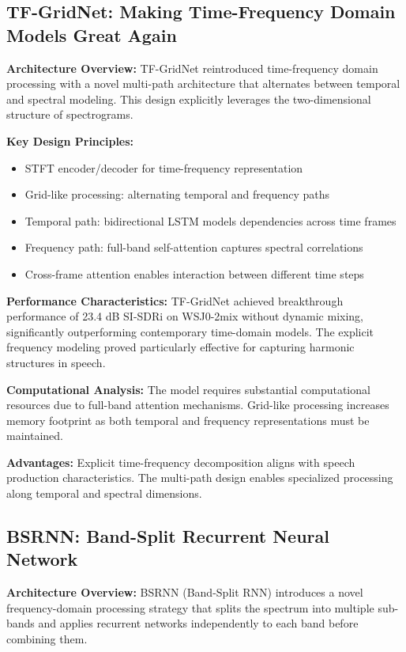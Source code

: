 \documentclass[conference]{IEEEtran}
\begin{document}
\subsection{TF-GridNet: Making Time-Frequency Domain Models Great Again}

\textbf{Architecture Overview:} TF-GridNet \cite{wang2023tfgridnet} reintroduced time-frequency domain processing with a novel multi-path architecture that alternates between temporal and spectral modeling. This design explicitly leverages the two-dimensional structure of spectrograms.

\textbf{Key Design Principles:}
\begin{itemize}
    \item STFT encoder/decoder for time-frequency representation
    \item Grid-like processing: alternating temporal and frequency paths
    \item Temporal path: bidirectional LSTM models dependencies across time frames
    \item Frequency path: full-band self-attention captures spectral correlations
    \item Cross-frame attention enables interaction between different time steps
\end{itemize}

\textbf{Performance Characteristics:} TF-GridNet achieved breakthrough performance of 23.4 dB SI-SDRi on WSJ0-2mix without dynamic mixing, significantly outperforming contemporary time-domain models. The explicit frequency modeling proved particularly effective for capturing harmonic structures in speech.

\textbf{Computational Analysis:} The model requires substantial computational resources due to full-band attention mechanisms. Grid-like processing increases memory footprint as both temporal and frequency representations must be maintained.

\textbf{Advantages:} Explicit time-frequency decomposition aligns with speech production characteristics. The multi-path design enables specialized processing along temporal and spectral dimensions.

\subsection{BSRNN: Band-Split Recurrent Neural Network}

\textbf{Architecture Overview:} BSRNN (Band-Split RNN) \cite{luo2022bsrnn} introduces a novel frequency-domain processing strategy that splits the spectrum into multiple sub-bands and applies recurrent networks independently to each band before combining them.
\end{document}
